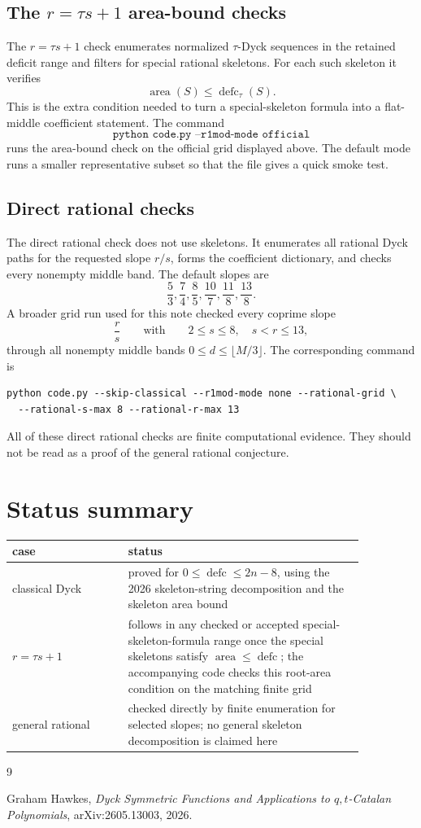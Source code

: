 \documentclass{article}
\DeclareMathOperator{\area}{area}
\DeclareMathOperator{\defc}{defc}
\begin{document}
\subsection*{The $r=\tau s+1$ area-bound checks}

The \(r=\tau s+1\) check enumerates normalized \(\tau\)-Dyck sequences in the
retained deficit range and filters for special rational skeletons.  For each
such skeleton it verifies
\[
  \area(S)\le \defc_\tau(S).
\]
This is the extra condition needed to turn a special-skeleton formula into a
flat-middle coefficient statement.  The command
\[
  \texttt{python code.py --r1mod-mode official}
\]
runs the area-bound check on the official grid displayed above.  The default
mode runs a smaller representative subset so that the file gives a quick smoke
test.

\subsection*{Direct rational checks}

The direct rational check does not use skeletons.  It enumerates all rational
Dyck paths for the requested slope \(r/s\), forms the coefficient dictionary,
and checks every nonempty middle band.  The default slopes are
\[
  \frac53,
  \frac74,
  \frac85,
  \frac{10}{7},
  \frac{11}{8},
  \frac{13}{8}.
\]
A broader grid run used for this note checked every coprime slope
\[
  \frac{r}{s}
  \qquad\text{with}\qquad
  2\le s\le8,
  \quad s<r\le13,
\]
through all nonempty middle bands \(0\le d\le\lfloor M/3\rfloor\).  The
corresponding command is
\begin{verbatim}
python code.py --skip-classical --r1mod-mode none --rational-grid \
  --rational-s-max 8 --rational-r-max 13
\end{verbatim}
All of these direct rational checks are finite computational evidence.
They should not be read as a proof of the general rational conjecture.

\section{Status summary}

\begin{center}
\begin{tabular}{p{0.28\linewidth}|p{0.58\linewidth}}
case & status\\
\hline
classical Dyck & proved for \(0\le\defc\le2n-8\), using the 2026
skeleton-string decomposition and the skeleton area bound\\
\(r=\tau s+1\) & follows in any checked or accepted special-skeleton-formula
range once the special skeletons satisfy \(\area\le\defc\); the accompanying
code checks this root-area condition on the matching finite grid\\
general rational & checked directly by finite enumeration for selected slopes;
no general skeleton decomposition is claimed here
\end{tabular}
\end{center}

\begin{thebibliography}{9}

Graham Hawkes,
\emph{Dyck Symmetric Functions and Applications to \(q,t\)-Catalan
Polynomials}, arXiv:2605.13003, 2026.

\end{thebibliography}
\end{document}
